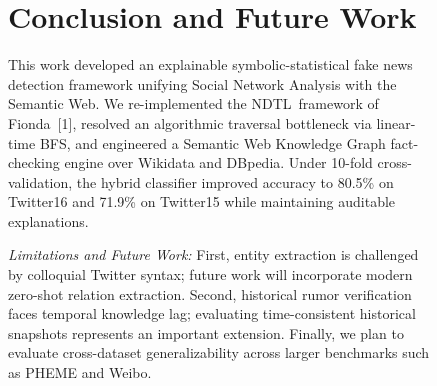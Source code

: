 \documentclass[10pt,twocolumn,a4paper]{article}
\newcommand{\NDTL}{\textsc{NDTL}}
\begin{document}
\begin{figure}[t]
\section{Conclusion and Future Work}
This work developed an explainable symbolic-statistical fake news detection framework unifying Social Network Analysis with the Semantic Web. We re-implemented the \NDTL\ framework of Fionda~[1], resolved an algorithmic traversal bottleneck via linear-time BFS, and engineered a Semantic Web Knowledge Graph fact-checking engine over Wikidata and DBpedia. Under 10-fold cross-validation, the hybrid classifier improved accuracy to 80.5\% on Twitter16 and 71.9\% on Twitter15 while maintaining auditable explanations.
 
\emph{Limitations and Future Work:} First, entity extraction is challenged by colloquial Twitter syntax; future work will incorporate modern zero-shot relation extraction. Second, historical rumor verification faces temporal knowledge lag; evaluating time-consistent historical snapshots represents an important extension. Finally, we plan to evaluate cross-dataset generalizability across larger benchmarks such as PHEME and Weibo.
 

\end{figure}
\end{document}
